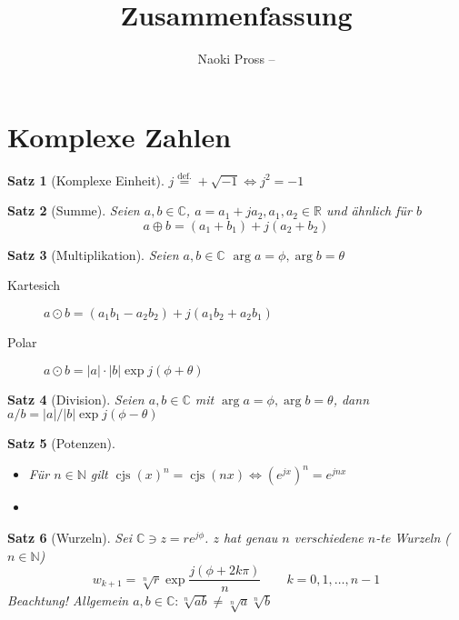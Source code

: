 \documentclass[]{tex/hsrzf}
\author{Naoki Pross -- \texttt{\theauthoremail}}
\title{\texttt{\themodule} Zusammenfassung}
\date{\thesemester}
\newcommand\defeq{\overset{\mathrm{def.}}{=}}
\newcommand\Nset{\mathbb{N}}
\newcommand\Rset{\mathbb{R}}
\newcommand\Cset{\mathbb{C}}
\DeclareMathOperator\cjs{cjs}
\newcommand\ej[1]{e^{j#1}}
\theoremstyle{komfourzf}
\newtheorem{theorem}{Satz}
\begin{document}
\maketitle
\tableofcontents

\section{Komplexe Zahlen}

\begin{theorem}[Komplexe Einheit]
\(
  j \defeq +\sqrt{-1} \iff j^2 = -1
\)
\end{theorem}

\begin{theorem}[Summe] Seien \(a, b \in \Cset\),
  \(a = a_1 + ja_2, a_1,a_2 \in \Rset\) und \"ahnlich f\"ur \(b\)
\[
  a \oplus b =  (a_1 + b_1) + j (a_2 + b_2)
\]
\end{theorem}

\begin{theorem}[Multiplikation] Seien \(a, b \in \Cset\)
  \(\arg a = \phi, \arg b = \theta\)
  \begin{description}
    \item[Kartesich] \(a \odot b = (a_1 b_1 - a_2 b_2) + j (a_1 b_2 + a_2 b_1)\)
    \item[Polar] \(a\odot b = |a|\cdot|b|\exp{j(\phi + \theta)}\)
  \end{description} 
\end{theorem}

\begin{theorem}[Division] Seien \(a, b \in \Cset\)
  mit \(\arg a = \phi, \arg b = \theta\),
  dann \(a / b = |a|/|b|\exp{j(\phi - \theta)}\)
\end{theorem}

\begin{theorem}[Potenzen]~
  \begin{itemize}
    \item F\"ur \(n \in \Nset\) gilt
      \(\cjs(x)^n = \cjs(nx) \iff \left(\ej{x}\right)^n = \ej{nx}\)
    \item 
  \end{itemize}
\end{theorem}

\begin{theorem}[Wurzeln] Sei \(\Cset \ni z = r\ej{\phi}\).
  \(z\) hat genau \(n\) verschiedene \(n\)-te Wurzeln
  (\(n \in \Nset\))
  \[
    w_{k+1} = \sqrt[n]{r}\exp \frac{j(\phi + 2k\pi)}{n}
      \qquad k = 0,1,\ldots,n-1
  \]
  Beachtung! Allgemein \(a,b \in \Cset: \sqrt[n]{ab} \neq \sqrt[n]{a}\sqrt[n]{b}\)
\end{theorem}
\end{document}
